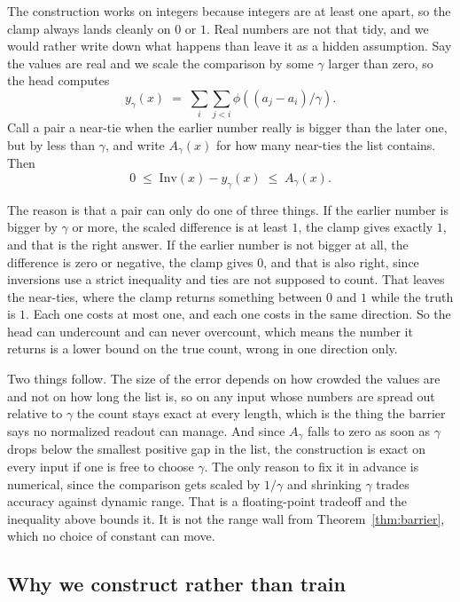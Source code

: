 \documentclass[10pt]{article}
\theoremstyle{definition}
\newcommand{\Inv}{\mathrm{Inv}}
\begin{document}
The construction works on integers because integers are at least one apart,
so the clamp always lands cleanly on $0$ or $1$. Real numbers are not that
tidy, and we would rather write down what happens than leave it as a hidden assumption. Say the values are real and we scale the comparison by some
$\gamma$ larger than zero, so the head computes
\[
  y_{\gamma}(x) \;=\; \sum_{i} \sum_{j < i} \phi\!\left( (a_j - a_i)/\gamma \right).
\]
Call a pair a near-tie when the earlier number really is bigger than the
later one, but by less than $\gamma$, and write $A_{\gamma}(x)$ for how many
near-ties the list contains. Then
\[
  0 \;\le\; \Inv(x) - y_{\gamma}(x) \;\le\; A_{\gamma}(x).
\]

The reason is that a pair can only do one of three things. If the earlier
number is bigger by $\gamma$ or more, the scaled difference is at least $1$,
the clamp gives exactly $1$, and that is the right answer. If the earlier
number is not bigger at all, the difference is zero or negative, the clamp
gives $0$, and that is also right, since inversions use a strict inequality
and ties are not supposed to count. That leaves the near-ties, where the
clamp returns something between $0$ and $1$ while the truth is $1$. Each
one costs at most one, and each one costs in the same direction. So the head
can undercount and can never overcount, which means the number it returns is a lower bound on the true count, wrong in one direction only.

Two things follow. The size of the error depends on how crowded the values
are and not on how long the list is, so on any input whose numbers are
spread out relative to $\gamma$ the count stays exact at every length, which
is the thing the barrier says no normalized readout can manage. And since
$A_{\gamma}$ falls to zero as soon as $\gamma$ drops below the smallest
positive gap in the list, the construction is exact on every input if one is free to choose $\gamma$. The only reason to fix it in advance is
numerical, since the comparison gets scaled by $1/\gamma$ and shrinking
$\gamma$ trades accuracy against dynamic range. That is a floating-point
tradeoff and the inequality above bounds it. It is not the range wall from
Theorem~\ref{thm:barrier}, which no choice of constant can move.

\subsection{Why we construct rather than train}
\label{sec:why-construct}
\end{document}
